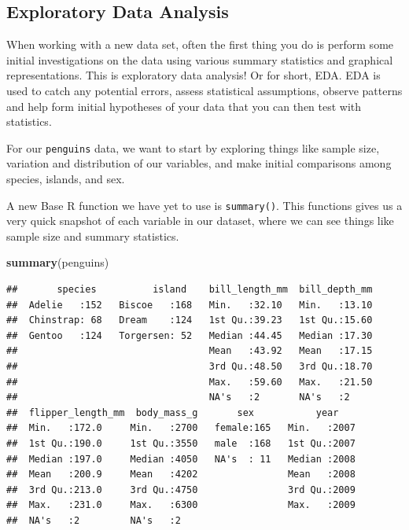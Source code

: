 \documentclass[
]{book}
\newenvironment{Shaded}{\begin{snugshade}}{\end{snugshade}}
\newcommand{\FunctionTok}[1]{\textcolor[rgb]{0.13,0.29,0.53}{\textbf{#1}}}
\newcommand{\NormalTok}[1]{#1}
\begin{document}
\hypertarget{exploratory-data-analysis-1}{%
\subsection{Exploratory Data Analysis}\label{exploratory-data-analysis-1}}

When working with a new data set, often the first thing you do is perform some initial investigations on the data using various summary statistics and graphical representations. This is exploratory data analysis! Or for short, EDA. EDA is used to catch any potential errors, assess statistical assumptions, observe patterns and help form initial hypotheses of your data that you can then test with statistics.

For our \texttt{penguins} data, we want to start by exploring things like sample size, variation and distribution of our variables, and make initial comparisons among species, islands, and sex.

A new Base R function we have yet to use is \texttt{summary()}. This functions gives us a very quick snapshot of each variable in our dataset, where we can see things like sample size and summary statistics.

\begin{Shaded}
\begin{Highlighting}[]
\FunctionTok{summary}\NormalTok{(penguins)}
\end{Highlighting}
\end{Shaded}

\begin{verbatim}
##       species          island    bill_length_mm  bill_depth_mm  
##  Adelie   :152   Biscoe   :168   Min.   :32.10   Min.   :13.10  
##  Chinstrap: 68   Dream    :124   1st Qu.:39.23   1st Qu.:15.60  
##  Gentoo   :124   Torgersen: 52   Median :44.45   Median :17.30  
##                                  Mean   :43.92   Mean   :17.15  
##                                  3rd Qu.:48.50   3rd Qu.:18.70  
##                                  Max.   :59.60   Max.   :21.50  
##                                  NA's   :2       NA's   :2      
##  flipper_length_mm  body_mass_g       sex           year     
##  Min.   :172.0     Min.   :2700   female:165   Min.   :2007  
##  1st Qu.:190.0     1st Qu.:3550   male  :168   1st Qu.:2007  
##  Median :197.0     Median :4050   NA's  : 11   Median :2008  
##  Mean   :200.9     Mean   :4202                Mean   :2008  
##  3rd Qu.:213.0     3rd Qu.:4750                3rd Qu.:2009  
##  Max.   :231.0     Max.   :6300                Max.   :2009  
##  NA's   :2         NA's   :2
\end{verbatim}
\end{document}
